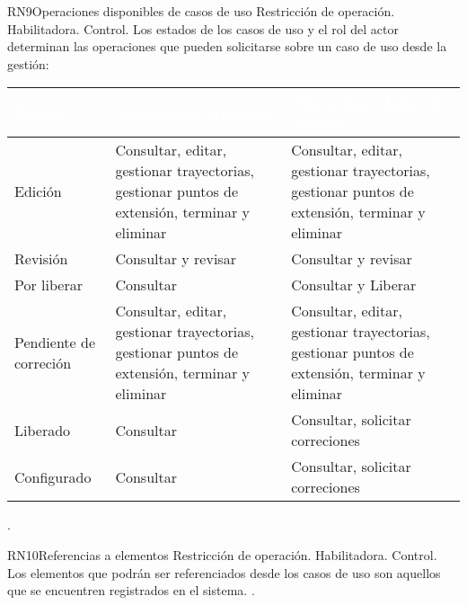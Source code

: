 \begin{BussinesRule}{RN9}{Operaciones disponibles de casos de uso} 
	\BRitem[Tipo:] Restricción de operación. 
	\BRitem[Clase:] Habilitadora. 
	\BRitem[Nivel:] Control. %
	\BRitem[Descripción:] Los estados de los casos de uso y el rol del actor determinan las operaciones que pueden solicitarse sobre un caso de uso desde la gestión:
	
	\begin{table}[H]
		\centering
		\begin{tabular}{|p{5cm}| p{5cm}| p{5cm}|}
			\hline
			\rowcolor{blue} \textcolor{white}{\textbf{Estado}} & \textcolor{white}{\textbf{Operaciones Analista}} & \textcolor{white}{\textbf{Operaciones Líder de Análisis}} \\
			\hline
			Edición & Consultar, editar, gestionar trayectorias, gestionar puntos de extensión, terminar y eliminar & Consultar, editar, gestionar trayectorias, gestionar puntos de extensión, terminar y eliminar \\
			\hline
			Revisión & Consultar y revisar & Consultar y revisar\\
			\hline
			Por liberar & Consultar & Consultar y Liberar\\
			\hline
			Pendiente de correción & Consultar, editar, gestionar trayectorias, gestionar puntos de extensión, terminar y eliminar & Consultar, editar, gestionar trayectorias, gestionar puntos de extensión, terminar y eliminar\\
			\hline
			Liberado & Consultar & Consultar, solicitar correciones\\
			\hline
			Configurado & Consultar & Consultar, solicitar correciones\\
			\hline
		\end{tabular}
	\end{table}

	 \UCref{}{}.
	
\end{BussinesRule}
	
	\begin{BussinesRule}{RN10}{Referencias a elementos} 
		\BRitem[Tipo:] Restricción de operación. 
		\BRitem[Clase:] Habilitadora. 
		\BRitem[Nivel:] Control. %
		\BRitem[Descripción:] Los elementos que podrán ser referenciados desde los casos de uso son aquellos que se encuentren registrados en el sistema.
		 \UCref{}{}. 
	\end{BussinesRule} 


